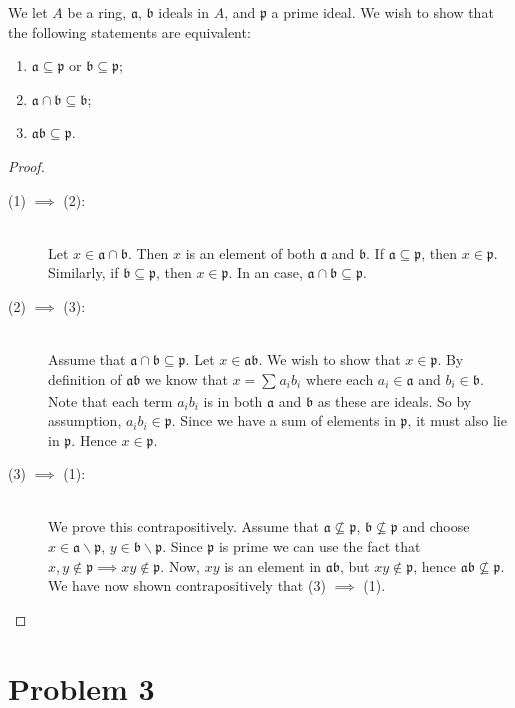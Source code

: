 \documentclass{article}
\newcommand{\p}{\mathfrak{p}}
\renewcommand{\a}{\mathfrak{a}}
\renewcommand{\b}{\mathfrak{b}}
\begin{document}
    We let $A$ be a ring, $\mathfrak{a}$, $\mathfrak{b}$ ideals in $A$, and
    $\mathfrak{p}$ a prime ideal. We wish to show that the following statements
    are equivalent:
    \begin{enumerate}[(1)]
        \item $\a \subseteq \p$ or $\b \subseteq \p$;
        \item $\a \cap \b \subseteq \b$;
        \item $\a\b \subseteq \p$.
    \end{enumerate}
    \begin{proof} 
        \hfill
        \begin{description}
            \item[(1) $\implies$ (2):]\hfill  \\
                Let $x \in \a\cap\b$.
                Then $x$ is an element of both $\mathfrak{a}$ and
                $\b$. If $\a \subseteq \p$, then
                $x \in \p$. Similarly, if $\b \subseteq
                \p$, then $x \in \p$. In an case,
                $\a\cap\b \subseteq \p$.
            \item[(2) $\implies$ (3):]\hfill \\
                Assume that $\a \cap \b \subseteq \p$. Let $x \in \a\b$. We
                wish to show that $x \in \p$. By definition of $\a\b$ we know
                that $x = \sum^{}_{} a_ib_i$ where each $a_i \in \a$ and $b_i
                \in \b$. Note that each term $a_ib_i$ is in both $\a$ and $\b$
                as these are ideals. So by assumption, $a_ib_i \in \p$. Since
                we have a sum of elements in $\p$, it must also lie in $\p$.
                Hence $x \in \p$.
            \item[(3) $\implies$ (1):]\hfill \\
                We prove this contrapositively. Assume that $\a \not\subseteq
                \p$, $\b \not\subseteq \p$ and choose $x \in \a \smallsetminus
                \p$, $y \in \b \smallsetminus \p$. Since $\p$ is prime we can
                use the fact that $x, y \notin \p \implies xy \notin \p$. Now,
                $xy$ is an element in $\a\b$, but $xy \notin \p$, hence $\a\b
                \not\subseteq \p$. We have now shown contrapositively that (3)
                $\implies$ (1).
        \end{description}
    \end{proof}
    
    \section*{Problem 3}
    \label{sec:problem_3}
     
\end{document}
